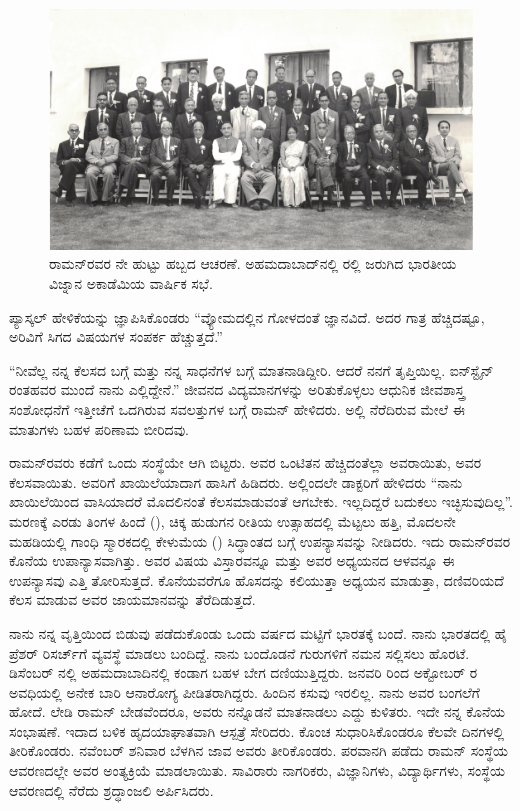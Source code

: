 \begin{figure}
\includegraphics{"images/13.jpg"}
\caption{ ರಾಮನ್‌ರವರ ನೇ ಹುಟ್ಟು ಹಬ್ಬದ ಆಚರಣೆ. ಅಹಮದಾಬಾದ್‌ನಲ್ಲಿ ರಲ್ಲಿ ಜರುಗಿದ ಭಾರತೀಯ ವಿಜ್ನಾನ ಅಕಾಡೆಮಿಯ ವಾರ್ಷಿಕ ಸಭೆ.}
\end{figure}

ಪ್ಯಾಸ್ಕಲ್ ಹೇಳಿಕೆಯನ್ನು ಜ್ಞಾಪಿಸಿಕೊಂಡರು\enginline{-} “ವ್ಯೋಮದಲ್ಲಿನ ಗೋಳದಂತೆ ಜ್ಞಾನವಿದೆ. ಅದರ ಗಾತ್ರ ಹೆಚ್ಚಿದಷ್ಟೂ, ಅರಿವಿಗೆ ಸಿಗದ ವಿಷಯಗಳ ಸಂಪರ್ಕ ಹೆಚ್ಚುತ್ತದೆ.”

 “ನೀವೆಲ್ಲ ನನ್ನ ಕೆಲಸದ ಬಗ್ಗೆ ಮತ್ತು ನನ್ನ ಸಾಧನೆಗಳ ಬಗ್ಗೆ ಮಾತನಾಡಿದ್ದೀರಿ. ಆದರೆ ನನಗೆ ತೃಪ್ತಿಯಿಲ್ಲ. ಐನ್‍ಸ್ಟೈನ್ ರಂತಹವರ ಮುಂದೆ ನಾನು ಎಲ್ಲಿದ್ದೇನೆ.” ಜೀವನದ ವಿದ್ಯಮಾನಗಳನ್ನು ಅರಿತುಕೊಳ್ಳಲು ಆಧುನಿಕ ಜೀವಶಾಸ್ತ್ರ ಸಂಶೋಧನೆಗೆ ಇತ್ತೀಚೆಗೆ ಒದಗಿರುವ ಸವಲತ್ತುಗಳ ಬಗ್ಗೆ ರಾಮನ್ ಹೇಳಿದರು. ಅಲ್ಲಿ ನೆರೆದಿರುವ ಮೇಲೆ ಈ ಮಾತುಗಳು ಬಹಳ ಪರಿಣಾಮ ಬೀರಿದವು.

ರಾಮನ್‍ರವರು ಕಡೆಗೆ ಒಂದು ಸಂಸ್ಥೆಯೇ ಆಗಿ ಬಿಟ್ಟರು. ಅವರ ಒಂಟಿತನ ಹೆಚ್ಚಿದಂತೆಲ್ಲಾ ಅವರಾಯಿತು, ಅವರ ಕೆಲಸವಾಯಿತು. ಅವರಿಗೆ ಖಾಯಿಲೆಯಾದಾಗ ಹಾಸಿಗೆ ಹಿಡಿದರು. ಅಲ್ಲಿಂದಲೇ ಡಾಕ್ಟರಿಗೆ ಹೇಳಿದರು\enginline{-} “ನಾನು ಖಾಯಿಲೆಯಿಂದ ವಾಸಿಯಾದರೆ ಮೊದಲಿನಂತೆ ಕೆಲಸಮಾಡುವಂತೆ ಆಗಬೇಕು. ಇಲ್ಲದಿದ್ದರೆ ಬದುಕಲು ಇಚ್ಛಿಸುವುದಿಲ್ಲ”. ಮರಣಕ್ಕೆ ಎರಡು ತಿಂಗಳ ಹಿಂದೆ (), ಚಿಕ್ಕ ಹುಡುಗನ ರೀತಿಯ ಉತ್ಸಾಹದಲ್ಲಿ ಮೆಟ್ಟಲು ಹತ್ತಿ, ಮೊದಲನೇ ಮಹಡಿಯಲ್ಲಿ ಗಾಂಧಿ ಸ್ಮಾರಕದಲ್ಲಿ ಕೇಳುಮೆಯ () ಸಿದ್ಧಾಂತದ ಬಗ್ಗೆ ಉಪನ್ಯಾಸವನ್ನು ನೀಡಿದರು. ಇದು ರಾಮನ್‍ರವರ ಕೊನೆಯ ಉಪಾನ್ಯಾಸವಾಗಿತ್ತು. ಅವರ ವಿಷಯ ವಿಸ್ತಾರವನ್ನೂ ಮತ್ತು ಅವರ ಅಧ್ಯಯನದ ಆಳವನ್ನೂ ಈ ಉಪನ್ಯಾಸವು ಎತ್ತಿ ತೋರಿಸುತ್ತದೆ. ಕೊನೆಯವರೆಗೂ ಹೊಸದನ್ನು ಕಲಿಯುತ್ತಾ ಅಧ್ಯಯನ ಮಾಡುತ್ತಾ, ದಣಿವರಿಯದೆ ಕೆಲಸ ಮಾಡುವ ಅವರ ಜಾಯಮಾನವನ್ನು ತೆರೆದಿಡುತ್ತದೆ.

ನಾನು ನನ್ನ ವೃತ್ತಿಯಿಂದ ಬಿಡುವು ಪಡೆದುಕೊಂಡು ಒಂದು ವರ್ಷದ ಮಟ್ಟಿಗೆ ಭಾರತಕ್ಕೆ ಬಂದೆ. ನಾನು ಭಾರತದಲ್ಲಿ ಹೈ ಪ್ರೆಶರ್ ರಿಸರ್ಚ್‌ಗೆ ವ್ಯವಸ್ಥೆ ಮಾಡಲು ಬಂದಿದ್ದೆ. ನಾನು ಬಂದೊಡನೆ ಗುರುಗಳಿಗೆ ನಮನ ಸಲ್ಲಿಸಲು ಹೊರಟೆ.  ಡಿಸೆಂಬರ್ ನಲ್ಲಿ ಅಹಮದಾಬಾದಿನಲ್ಲಿ ಕಂಡಾಗ ಬಹಳ ಬೇಗ ದಣಿಯುತ್ತಿದ್ದರು. ಜನವರಿ  ರಿಂದ ಅಕ್ಟೋಬರ್  ರ ಅವಧಿಯಲ್ಲಿ ಅನೇಕ ಬಾರಿ ಆನಾರೋಗ್ಯ ಪೀಡಿತರಾಗಿದ್ದರು. ಹಿಂದಿನ ಕಸುವು ಇರಲಿಲ್ಲ. ನಾನು ಅವರ ಬಂಗಲೆಗೆ ಹೋದೆ. ಲೇಡಿ ರಾಮನ್ ಬೇಡವೆಂದರೂ, ಅವರು ನನ್ನೊಡನೆ ಮಾತನಾಡಲು ಎದ್ದು ಕುಳಿತರು. ಇದೇ ನನ್ನ ಕೊನೆಯ ಸಂಭಾಷಣೆ. ಇದಾದ ಬಳಿಕ ಹೃದಯಾಘಾತವಾಗಿ ಆಸ್ಪತ್ರೆ ಸೇರಿದರು. ಕೊಂಚ ಸುಧಾರಿಸಿಕೊಂಡರೂ ಕೆಲವೇ ದಿನಗಳಲ್ಲಿ ತೀರಿಕೊಂಡರು. ನವೆಂಬರ್  ಶನಿವಾರ ಬೆಳಗಿನ ಜಾವ ಅವರು ತೀರಿಕೊಂಡರು. ಪರವಾನಗಿ ಪಡೆದು ರಾಮನ್ ಸಂಸ್ಥೆಯ ಆವರಣದಲ್ಲೇ ಅವರ ಅಂತ್ಯಕ್ರಿಯೆ ಮಾಡಲಾಯಿತು. ಸಾವಿರಾರು ನಾಗರಿಕರು, ವಿಜ್ಞಾನಿಗಳು, ವಿದ್ಯಾರ್ಥಿಗಳು, ಸಂಸ್ಥೆಯ ಆವರಣದಲ್ಲಿ ನೆರೆದು ಶ್ರದ್ಧಾಂಜಲಿ ಅರ್ಪಿಸಿದರು.

